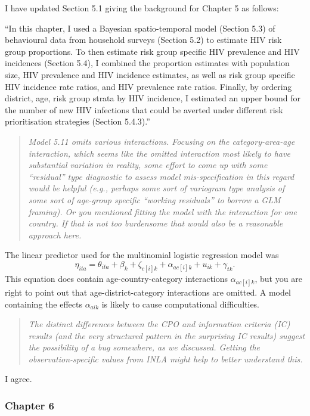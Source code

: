 \documentclass[
  12pt,
]{article}
\begin{document}
I have updated Section 5.1 giving the background for Chapter 5 as
follows:

``In this chapter, I used a Bayesian spatio-temporal model (Section 5.3)
of behavioural data from household surveys (Section 5.2) to estimate HIV
risk group proportions. To then estimate risk group specific HIV
prevalence and HIV incidences (Section 5.4), I combined the proportion
estimates with population size, HIV prevalence and HIV incidence
estimates, as well as risk group specific HIV incidence rate ratios, and
HIV prevalence rate ratios. Finally, by ordering district, age, risk
group strata by HIV incidence, I estimated an upper bound for the number
of new HIV infections that could be averted under different risk
prioritisation strategies (Section 5.4.3).''

\begin{quote}
\emph{Model 5.11 omits various interactions. Focusing on the
category-area-age interaction, which seems like the omitted interaction
most likely to have substantial variation in reality, some effort to
come up with some ``residual'' type diagnostic to assess model
mis-specification in this regard would be helpful (e.g., perhaps some
sort of variogram type analysis of some sort of age-group specific
``working residuals'' to borrow a GLM framing). Or you mentioned fitting
the model with the interaction for one country. If that is not too
burdensome that would also be a reasonable approach here.}
\end{quote}

The linear predictor used for the multinomial logistic regression model
was \[
\eta_{ita} = \theta_{ita} + \beta_k + \zeta_{c[i]k} + \alpha_{ac[i]k} + u_{ik} + \gamma_{tk}.
\] This equation does contain age-country-category interactions
\(\alpha_{ac[i]k}\), but you are right to point out that
age-district-category interactions are omitted. A model containing the
effects \(\alpha_{aik}\) is likely to cause computational difficulties.

\begin{quote}
\emph{The distinct differences between the CPO and information criteria
(IC) results (and the very structured pattern in the surprising IC
results) suggest the possibility of a bug somewhere, as we discussed.
Getting the observation-specific values from INLA might help to better
understand this.}
\end{quote}

I agree.

\subsubsection{Chapter 6}\label{chapter-6}
\end{document}
